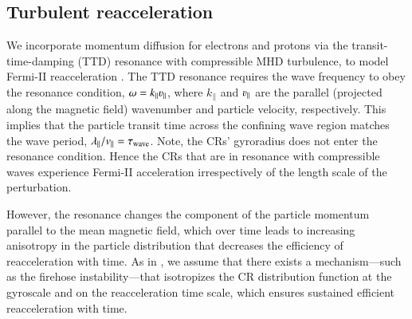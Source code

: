 \documentclass[fleqn,usenatbib,useAMS]{mnras}
\begin{document}
\subsection{Turbulent reacceleration}
\label{sec:reacc}

We incorporate momentum diffusion for electrons and protons via the
transit-time-damping (TTD) resonance with compressible MHD turbulence,
to model Fermi-II reacceleration \citep{brunetti07,brunetti11}. The
TTD resonance requires the wave frequency to obey the resonance
condition, $\omega=k_\parallel\varv_\parallel$, where $k_\parallel$
and $\varv_\parallel$ are the parallel (projected along the magnetic
field) wavenumber and particle velocity, respectively. This implies
that the particle transit time across the confining wave region
matches the wave period,
$\lambda_{\parallel}/v_{\parallel}=\tau_{{\mathrm{wave}}}$. Note, the CRs'
gyroradius does not enter the resonance condition. Hence the CRs that
are in resonance with compressible waves experience Fermi-II
acceleration irrespectively of the length scale of the perturbation.

However, the resonance changes the component of the particle momentum
parallel to the mean magnetic field, which over time leads to
increasing anisotropy in the particle distribution that decreases the
efficiency of reacceleration with time. As in \citet{brunetti11}, we
assume that there exists a mechanism---such as the firehose
instability---that isotropizes the CR distribution function at the
gyroscale and on the reacceleration time scale, which ensures
sustained efficient reacceleration with time.
\end{document}
